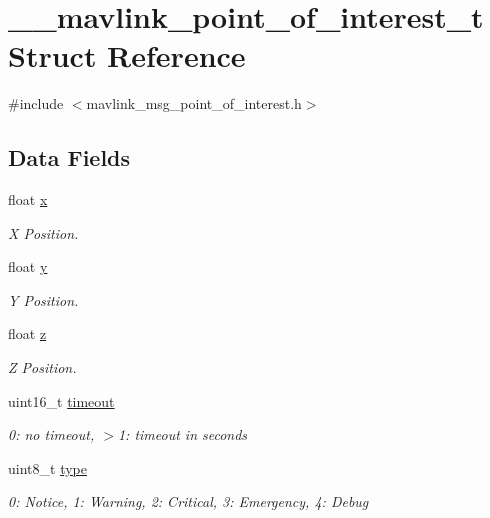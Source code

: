 \hypertarget{struct____mavlink__point__of__interest__t}{\section{\+\_\+\+\_\+mavlink\+\_\+point\+\_\+of\+\_\+interest\+\_\+t Struct Reference}
\label{struct____mavlink__point__of__interest__t}
}


{\ttfamily \#include $<$mavlink\+\_\+msg\+\_\+point\+\_\+of\+\_\+interest.\+h$>$}

\subsection*{Data Fields}
\begin{DoxyCompactItemize}
\item 
float \hyperlink{struct____mavlink__point__of__interest__t_aa512d9dfca8314d502e12efb7ed9ba2d}{x}
\begin{DoxyCompactList}\small\item\em X Position. \end{DoxyCompactList}\item 
float \hyperlink{struct____mavlink__point__of__interest__t_a0458262b0c6a60310c0003fa00f72986}{y}
\begin{DoxyCompactList}\small\item\em Y Position. \end{DoxyCompactList}\item 
float \hyperlink{struct____mavlink__point__of__interest__t_addd15732256b1d36abc1924f8691562c}{z}
\begin{DoxyCompactList}\small\item\em Z Position. \end{DoxyCompactList}\item 
uint16\+\_\+t \hyperlink{struct____mavlink__point__of__interest__t_a8708d61ab4a7cbc7197b052c5e33e37a}{timeout}
\begin{DoxyCompactList}\small\item\em 0\+: no timeout, $>$1\+: timeout in seconds \end{DoxyCompactList}\item 
uint8\+\_\+t \hyperlink{struct____mavlink__point__of__interest__t_aa9ac2d29aef58bfb1794539fdd98aa35}{type}
\begin{DoxyCompactList}\small\item\em 0\+: Notice, 1\+: Warning, 2\+: Critical, 3\+: Emergency, 4\+: Debug \end{DoxyCompactList}\item 

\end{DoxyCompactItemize}

